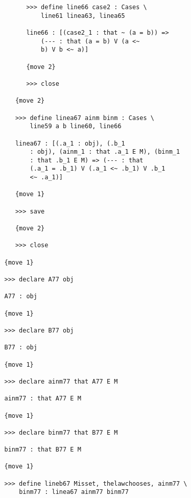 \documentclass[12pt]{article}
\begin{document}
\begin{verbatim}
         >>> define line66 case2 : Cases \
             line61 linea63, linea65

         line66 : [(case2_1 : that ~ (a = b)) => 
             (--- : that (a = b) V (a <~ 
             b) V b <~ a)]

         {move 2}

         >>> close

      {move 2}

      >>> define linea67 ainm binm : Cases \
          line59 a b line60, line66

      linea67 : [(.a_1 : obj), (.b_1 
          : obj), (ainm_1 : that .a_1 E M), (binm_1 
          : that .b_1 E M) => (--- : that 
          (.a_1 = .b_1) V (.a_1 <~ .b_1) V .b_1 
          <~ .a_1)]

      {move 1}

      >>> save

      {move 2}

      >>> close

   {move 1}

   >>> declare A77 obj

   A77 : obj

   {move 1}

   >>> declare B77 obj

   B77 : obj

   {move 1}

   >>> declare ainm77 that A77 E M

   ainm77 : that A77 E M

   {move 1}

   >>> declare binm77 that B77 E M

   binm77 : that B77 E M

   {move 1}

   >>> define lineb67 Misset, thelawchooses, ainm77 \
       binm77 : linea67 ainm77 binm77


\end{verbatim}
\end{document}
